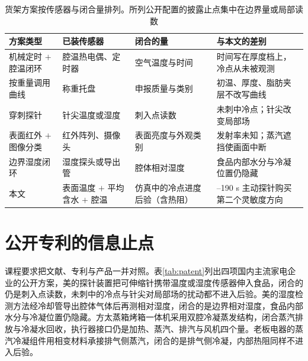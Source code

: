 \begin{table}[t]
\centering
\caption{货架方案按传感器与闭合量排列。所列公开配置的披露止点集中在边界量或局部读数}
\label{tab:product}
\begin{tabularx}{\textwidth}{l>{\raggedright\arraybackslash}p{3.4cm}>{\raggedright\arraybackslash}p{3.4cm}>{\raggedright\arraybackslash}p{3.6cm}}
\toprule
方案类型 & 已装传感器 & 闭合的量 & 与本文的差别 \\
\midrule
机械定时 $+$ 腔温闭环 & 腔温热电偶、定时器 & 空气温度与时间 & 时间写在厚度档上，冷点从未被观测 \\
按重量调用曲线 & 称重托盘 & 申报质量与类别 & 初温、厚度、脂肪夹层不改写曲线 \\
穿刺探针 & 针尖温度或湿度 & 刺入点读数 & 未刺中冷点；针尖改变局部场 \\
表面红外 $+$ 图像分类 & 红外阵列、摄像头 & 表面亮度与外观类别 & 发射率未知；蒸汽遮挡使画面中断 \\
边界湿度闭环 & 湿度探头或导出管 & 腔体相对湿度 & 食品内部水分与冷凝位置仍隐藏 \\
\midrule
本文 & 表面温度 $+$ 平均含水 $+$ 腔温 & 仿真中的冷点进度后验（含热阻） & 150--190 s 主动探针购买第二个灵敏度方向 \\
\bottomrule
\end{tabularx}
\end{table}

\section{公开专利的信息止点}

课程要求把文献、专利与产品一并对照。表\ref{tab:patent}{}列出四项国内主流家电企业的公开方案，美的探针装置把可伸缩针携带温度或湿度传感器伸入食品\cite{cn110793657}，闭合的仍是刺入点读数，未刺中的冷点与针尖对局部场的扰动都不进入后验。美的湿度检测方法经冷却管导出腔体气体后再测相对湿度\cite{cn111110016}，闭合的是边界相对湿度，食品内部水分与冷凝位置仍隐藏。方太蒸箱烤箱一体机采用双腔冷凝蒸发结构\cite{cn109965678}，闭合蒸汽排放与冷凝水回收，执行器接口仍是加热、蒸汽、排汽与风机四个量。老板电器的蒸汽冷凝组件用相变材料承接排气侧蒸汽\cite{cn114886312}，闭合的是排气侧冷凝，内部热阻同样不进入后验。

